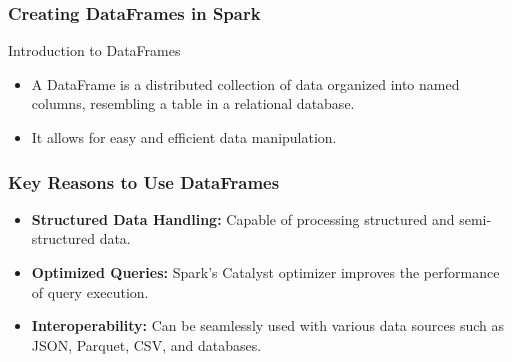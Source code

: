 \documentclass[aspectratio=169]{beamer}
\begin{document}
\begin{frame}
    \frametitle{Creating DataFrames in Spark}
    \begin{block}{Introduction to DataFrames}
        \begin{itemize}
            \item A DataFrame is a distributed collection of data organized into named columns, resembling a table in a relational database.
            \item It allows for easy and efficient data manipulation.
        \end{itemize}
    \end{block}
\end{frame}

\begin{frame}
    \frametitle{Key Reasons to Use DataFrames}
    \begin{itemize}
        \item \textbf{Structured Data Handling:} Capable of processing structured and semi-structured data.
        \item \textbf{Optimized Queries:} Spark’s Catalyst optimizer improves the performance of query execution.
        \item \textbf{Interoperability:} Can be seamlessly used with various data sources such as JSON, Parquet, CSV, and databases.
    \end{itemize}
\end{frame}
\end{document}
